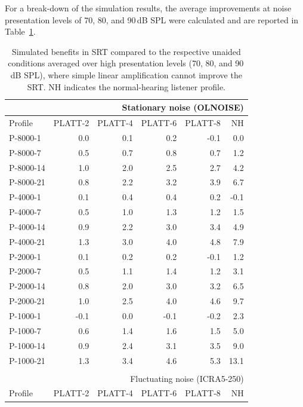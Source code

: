 \documentclass[10pt,a4paper,twocolumn]{article}
\begin{document}
For a break-down of the simulation results, the average improvements at noise presentation levels of 70, 80, and 90\,dB SPL were calculated and are reported in Table~\ref{tab:1}.
%
\begin{table}[h]
	\small\sf\centering
	\caption{\label{tab:1}
	 Simulated benefits in SRT compared to the respective unaided conditions averaged over high presentation levels (70, 80, and 90\,dB SPL), where simple linear amplification cannot improve the SRT. NH indicates the normal-hearing listener profile.
	}
	\begin{tabular}{l|rrrr|r}
		\multicolumn{6}{r}{Stationary noise (OLNOISE)}\\
		\hline
		\hline
		Profile & \footnotesize \footnotesize PLATT-2 & \footnotesize PLATT-4 & \footnotesize PLATT-6 & \footnotesize PLATT-8 & NH\\
		\hline
		P-8000-1  &  0.0 &  0.1 &  0.2 & -0.1 &  0.0\\
		P-8000-7  &  0.5 &  0.7 &  0.8 &  0.7 &  1.2\\
		P-8000-14 &  1.0 &  2.0 &  2.5 &  2.7 &  4.2\\
		P-8000-21 &  0.8 &  2.2 &  3.2 &  3.9 &  6.7\\
		\hline
		P-4000-1  &  0.1 &  0.4 &  0.4 &  0.2 & -0.1\\
		P-4000-7  &  0.5 &  1.0 &  1.3 &  1.2 &  1.5\\
		P-4000-14 &  0.9 &  2.2 &  3.0 &  3.4 &  4.9\\
		P-4000-21 &  1.3 &  3.0 &  4.0 &  4.8 &  7.9\\
		\hline
		P-2000-1  &  0.1 &  0.2 &  0.2 & -0.1 &  1.2\\
		P-2000-7  &  0.5 &  1.1 &  1.4 &  1.2 &  3.1\\
		P-2000-14 &  0.8 &  2.0 &  3.0 &  3.2 &  6.5\\
		P-2000-21 &  1.0 &  2.5 &  4.0 &  4.6 &  9.7\\
		\hline
		P-1000-1  & -0.1 &  0.0 & -0.1 & -0.2 &  2.3\\
		P-1000-7  &  0.6 &  1.4 &  1.6 &  1.5 &  5.0\\
		P-1000-14 &  0.9 &  2.4 &  3.1 &  3.5 &  9.0\\
		P-1000-21 &  1.3 &  3.4 &  4.6 &  5.3 & 13.1\\
		\hline
		\hline
		\multicolumn{6}{r}{ }\\
		\multicolumn{6}{r}{Fluctuating noise (ICRA5-250)}\\
		\hline
		\hline
		Profile & \footnotesize \footnotesize PLATT-2 & \footnotesize PLATT-4 & \footnotesize PLATT-6 & \footnotesize PLATT-8 & NH\\

\end{tabular}
\end{table}
\end{document}
